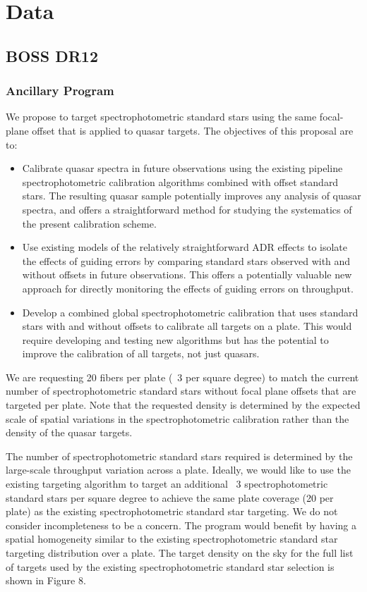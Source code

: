 \documentclass[preprint2]{aastex}
\begin{document}
\section{Data}

\subsection{BOSS DR12}

\subsubsection{Ancillary Program}

We propose to target spectrophotometric standard stars using the same focal-plane offset that is applied to quasar targets. The objectives of this proposal are to:

\begin{itemize}
\item Calibrate quasar spectra in future observations using the existing pipeline spectrophotometric calibration algorithms combined with offset standard stars. The resulting quasar sample potentially improves any analysis of quasar spectra, and offers a straightforward method for studying the systematics of the present calibration scheme.
\item Use existing models of the relatively straightforward ADR effects to isolate the effects of guiding errors by comparing standard stars observed with and without offsets in future observations. This offers a potentially valuable new approach for directly monitoring the effects of guiding errors on throughput.
\item Develop a combined global spectrophotometric calibration that uses standard stars with and without offsets to calibrate all targets on a plate. This would require developing and testing new algorithms but has the potential to improve the calibration of all targets, not just quasars.
\end{itemize}

We are requesting 20 fibers per plate (~3 per square degree) to match the current number of spectrophotometric standard stars without focal plane offsets that are targeted per plate. Note that the requested density is determined by the expected scale of spatial variations in the spectrophotometric calibration rather than the density of the quasar targets.

The number of spectrophotometric standard stars required is determined by the large-scale throughput variation across a plate. Ideally, we would like to use the existing targeting algorithm to target an additional ~3 spectrophotometric standard stars per square degree to achieve the same plate coverage (20 per plate) as the existing spectrophotometric standard star targeting. We do not consider incompleteness to be a concern. The program would benefit by having a spatial homogeneity similar to the existing spectrophotometric standard star targeting distribution over a plate. The target density on the sky for the full list of targets used by the existing spectrophotometric standard star selection is shown in Figure 8.
\end{document}
